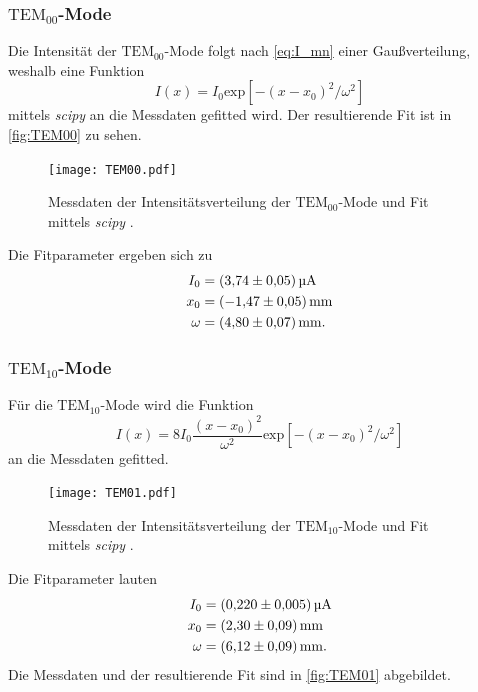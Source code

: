 \subsubsection{$\text{TEM}_{00}$-Mode}

Die Intensität der $\text{TEM}_{00}$-Mode folgt nach \autoref{eq:I_mn} einer Gaußverteilung, weshalb eine Funktion
\begin{equation*}
  I(x) = I_0 \text{exp}\left[-(x-x_0)^2/\omega^2\right]
\end{equation*}
mittels \textit{scipy} \cite{scipy} an die Messdaten gefitted wird.
Der resultierende Fit ist in \autoref{fig:TEM00} zu sehen.
\begin{figure}[H]
  \centering
  \texttt{[image: TEM00.pdf]}
  \caption{Messdaten der Intensitätsverteilung der $\text{TEM}_{00}$-Mode und Fit mittels \textit{scipy} \cite{scipy}.}
  \label{fig:TEM00}
\end{figure}

Die Fitparameter ergeben sich zu 
\begin{align*}
  I_0 &= \qty{3.74 +- 0.05}{\micro\ampere} \\
  x_0 &= \qty{-1.47 +- 0.05}{\milli\metre} \\
  \omega &= \qty{4.80 +- 0.07}{\milli\metre}.
\end{align*}

\subsubsection{$\text{TEM}_{10}$-Mode}

Für die $\text{TEM}_{10}$-Mode wird die Funktion
\begin{equation*}
  I(x) = 8I_0\frac{(x-x_0)^2}{\omega^2} \text{exp}\left[-(x-x_0)^2/\omega^2\right]
\end{equation*}
an die Messdaten gefitted.
\begin{figure}[H]
  \centering
  \texttt{[image: TEM01.pdf]}
  \caption{Messdaten der Intensitätsverteilung der $\text{TEM}_{10}$-Mode und Fit mittels \textit{scipy} \cite{scipy}.}
  \label{fig:TEM01}
\end{figure}
Die Fitparameter lauten
\begin{align*}
  I_0 &= \qty{0.22 +- 0.005}{\micro\ampere} \\
  x_0 &= \qty{2.30 +- 0.09}{\milli\metre} \\
  \omega &= \qty{6.12 +- 0.09}{\milli\metre}.
\end{align*}
Die Messdaten und der resultierende Fit sind in \autoref{fig:TEM01} abgebildet.
